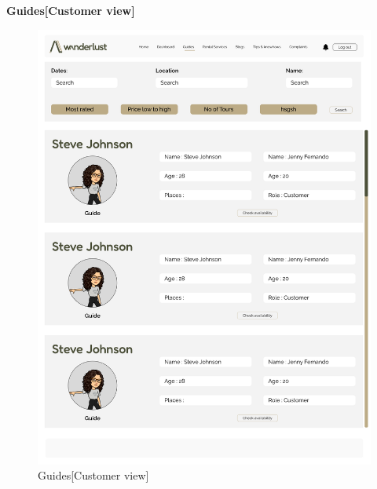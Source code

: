 \textbf{Guides[Customer view]}\\
\begin{figure}[h!]
    \centering
    \includegraphics[width=1\textwidth]{Images/Wireframes/Customer Guides.png}
    \caption{Guides[Customer view]}
\end{figure}
\clearpage

